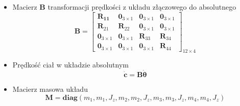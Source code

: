 \begin{itemize}
\begin{equation}
\begin{aligned}
             \boldsymbol{\dot{\breve{d}}}_{21}&=\boldsymbol{s}_1^A \dot \varphi_1-\boldsymbol{s}_1^B \dot \varphi_1+\boldsymbol{s}_2^B \dot \varphi_2\\
             \boldsymbol{\breve d}_{22}&=\boldsymbol{s}_2^B \dot \varphi_2\\
             \boldsymbol{\breve d}_{33}&=\boldsymbol{s}_3^D \dot \varphi_3\\
             \boldsymbol{\breve d}_{34}&=\boldsymbol{s}_4^E \dot \varphi_4-\boldsymbol{s}_4^D\dot \varphi_4+\boldsymbol{s}_3^D\dot \varphi_3\\
             \boldsymbol{\breve d}_{44}&=\boldsymbol{s}_4^E\dot \varphi_4\\
            \end{aligned}
        \end{equation}
    \item Macierz $\boldsymbol{B}$ transformacji prędkości z układu złączowego do absolutnego
        \begin{equation}
            \label{eq:B_matrix}
            \boldsymbol{B} = \begin{bmatrix}
                                \boldsymbol{R_{11}} & \boldsymbol{0}_{3\times1} &\boldsymbol{0}_{3\times1} &\boldsymbol{0}_{3\times1}\\
                                \boldsymbol{R}_{21} & \boldsymbol{R}_{22} & \boldsymbol{0}_{3\times1} & \boldsymbol{0}_{3\times1}\\ 
                                \boldsymbol{0}_{3\times1} & \boldsymbol{0}_{3\times1}&\boldsymbol{R}_{33}&\boldsymbol{R}_{34}\\
                                \boldsymbol{0}_{3\times1} & \boldsymbol{0}_{3\times1} & \boldsymbol{0}_{3\times1} & \boldsymbol{R}_{44}
                             \end{bmatrix}_{12\times4}
        \end{equation}
    \item Prędkość ciał w układzie absolutnym
        \begin{equation}
            \label{eq:c_velocity}
                \boldsymbol{\dot c} = \boldsymbol{B}\boldsymbol{\dot \theta}
        \end{equation}
    \item Macierz masowa układu
        \begin{equation}
            \label{eq:mass_matrix}
                \boldsymbol{M} = \boldsymbol{diag}(m_1, m_1,J_z,m_2,m_2,J_z,m_3,m_3,J_z,m_4,m_4,J_z)
        \end{equation}

\end{itemize}
